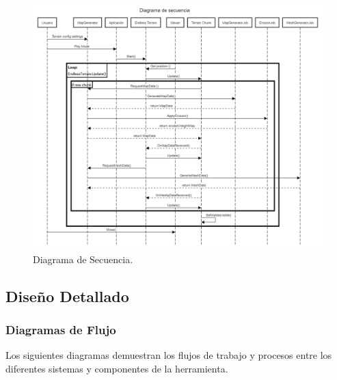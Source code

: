 \begin{figure}[H]
    \centering
    \includegraphics[width=1\textwidth]{img/Diagrama de secuencia.png}
    \caption{Diagrama de Secuencia.}
\end{figure}
\newpage

\subsection{Diseño Detallado}

\subsubsection{Diagramas de Flujo}
Los siguientes diagramas demuestran los flujos de trabajo y procesos entre los diferentes sistemas y componentes de la herramienta.

